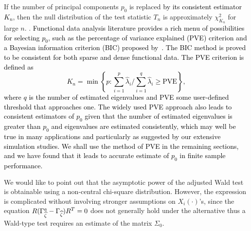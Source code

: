 \documentclass[times,sort&compress,3p]{elsarticle}
\theoremstyle{plain}%
\theoremstyle{definition}
\newcommand{\bR}{{R}}
\newcommand{\bzeta}{{\zeta}}
\newcommand{\ml}[1]{\textcolor{black}{{#1}}}
\begin{document}
If the number of principal components $p_0$ is replaced \ml{by its consistent estimator $K_n$}, then the null distribution of the test statistic $T_n$ is approximately $\chi_{K_n}^{2}$ for large $n$. {}. \ml{Functional data analysis literature provides a rich menu of possibilities for selecting $p_0$, such as the percentage of variance explained (PVE) criterion and a Bayesian information criterion (BIC) proposed by~\cite{Li+Wang+Carroll:13}. The BIC method is proved to be consistent for both sparse and dense functional data. The PVE criterion is defined as $$K_n = \min\left\{p:  \sum_{i = 1}^p \widehat{\lambda}_i / \sum_{i = 1}^{q} \widehat{\lambda}_i \geq \text{PVE} \right\},$$ where $q$ is the number of estimated eigenvalues and PVE some user-defined threshold that approaches one. The widely used PVE approach also leads to consistent estimators of $p_0$ given that the number of estimated eigenvalues is greater than $p_0$ and eigenvalues are estimated consistently, which may well be true in many applications and particularly as suggested by our extensive simulation studies.
We shall use the method of PVE in the remaining sections, and we have found that it leads to accurate estimate of $p_0$ in finite sample performance. }

{%
We would like to point out that the asymptotic power of the adjusted Wald test is obtainable using a non-central chi-square distribution. However, the expression is complicated without involving stronger assumptions on $X_i(\cdot)$'s, since the equation $\bR (\SigmaAdj_{\widehat \bzeta} - {\Gamma}_{\widehat \bzeta}) \bR^T = 0$ does not generally hold under the alternative thus a Wald-type test requires an estimate of the matrix $\Sigma_0$.  
}


\end{document}
